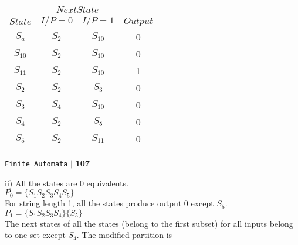 \documentclass{article}
\begin{document}
\vspace*{0.4cm}
\begin{center}
\begin{tabular}{cccc}
 \hline

 \hline

 \hline

 \hline
 & \multicolumn{2}{c}{$Next State$}\\
 \cline{2-3}
 $State$ &  $I/P=0$ & $I/P=1$  &  $Output$\\
\hline
$S_a$  & $S_2$   & $S_10$ & 0\\
$S_10$ & $S_2$  & $S_10$ & 0\\
$S_11$ & $S_2$  & $S_10$& 1\\
$S_2$  & $S_2$   & $S_3$  & 0\\
$S_3$  & $S_4$   & $S_10$ & 0\\
$S_4$  & $S_2$   & $S_5$  & 0\\
$S_5$  & $S_2$   & $S_11$ & 0\\
 \hline

 \hline

 \hline

 \hline
\end{tabular}
\end{center}


\newpage

\begin{flushright}
 \texttt{Finite Automata} \hspace*{0.1cm}\textbf{$|$} \hspace*{0.1cm} \textbf{107}\hspace*{0.1cm}
\end{flushright}
\vspace*{0.5cm}

ii) All the states are 0 equivalents.\\

\hspace*{4cm} $P_0 = \{S_1S_2S_3S_4S_5\}$ \\

\hspace*{0.5cm} For string length 1, all the states produce output 0 except $S_5$.\\

\hspace*{4cm} $P_1 = \{S_1S_2S_3S_4\}\{S_5\}$ \\

\hspace*{0.5cm} The next states of all the states (belong to the first subset) for all inputs belong to one set
except $S_4$. The modified partition is\\
\end{document}

